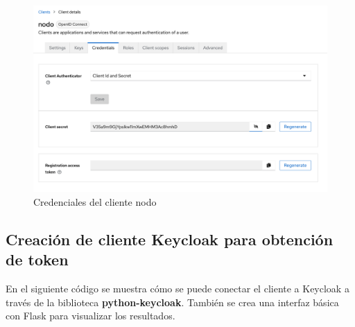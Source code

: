 \begin{figure}[H]
	\centering
	\includegraphics[width=0.9\linewidth]{Graphics/client_nodo_credentials}
	\caption{Credenciales del cliente nodo}
	\label{fig:clientnodocredentials}
\end{figure}


\subsection*{Creación de cliente Keycloak para obtención de token}

En el siguiente código se muestra cómo se puede conectar el cliente a Keycloak a través de la biblioteca \textbf{python-keycloak}. También se crea una interfaz básica con Flask para visualizar los resultados.




